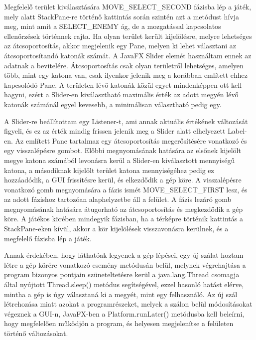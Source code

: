 Megfelelő terület kiválasztására MOVE\_SELECT\_SECOND fázisba lép a játék, mely alatt StackPane-re történő kattintás során szintén azt a metódust hívja meg, mint amit a SELECT\_ENEMY ág, de a mozgatással kapcsolatos ellenőrzések történnek rajta. Ha olyan terület került kijelölésre, melyre lehetséges az átcsoportosítás, akkor megjelenik egy Pane, melyen ki lehet választani az átcsoportosítandó katonák számát. A JavaFX Slider elemét használtam ennek az adatnak a bevitelére. Átcsoportosítás csak olyan területről lehetséges, amelyen több, mint egy katona van, csak ilyenkor jelenik meg a korábban említett ehhez kapcsolódó Pane. A területen lévő katonák közül egyet mindenképpen ott kell hagyni, ezért a Slider-en kiválasztható maximális érték az adott megyén lévő katonák számánál egyel kevesebb, a minimálisan választható pedig egy. 

A Slider-re beállítottam egy Listener-t, ami annak aktuális értékének változását figyeli, és ez az érték mindig frissen jelenik meg a Slider alatt elhelyezett Label-en. Az említett Pane tartalmaz egy átcsoportosítás megerősítésére vonatkozó és egy visszalépésre gombot. Előbbi megnyomásának hatására az elsőnek kijelölt megye katona számából levonásra kerül a Slider-en kiválasztott mennyiségű katona, a másodiknak kijelölt terület katona mennyiségéhez pedig ez hozzáadódik, a GUI frissítésre kerül, és elkezdődik a gép köre. A visszalépésre vonatkozó gomb megnyomására a fázis ismét MOVE\_SELECT\_FIRST lesz, és az adott fázishoz tartozóan alaphelyzetbe áll a felület. A fázis lezáró gomb megnyomásának hatására átugorható az átcsoportosítás és megkezdődik a gép köre. A játékos körében mindegyik fázisban, ha a térképre történik kattintás a StackPane-eken kívül, akkor a kör kijelölések visszavonásra kerülnek, és a megfelelő fázisba lép a játék. 

Annak érdekében, hogy láthatóak legyenek a gép lépései, egy új szálat hoztam létre a gép körére vonatkozó esemény metódusán belül, melynek végrehajtása a program bizonyos pontjain szüneteltetésre kerül a java.lang.Thread csomagja által nyújtott Thread.sleep() metódus segítségével, ezzel hasonló hatást elérve, mintha a gép is úgy választaná ki a megyét, mint egy felhasználó. Az új szál létrehozása miatt azokat a programrészeket, melyek a szálon belül módosításokat végeznek a GUI-n, JavaFX-ben a Platform.runLater() metódusba kell beleírni, hogy megfelelően működjön a program, és helyesen megjelenítse a felületen történő változásokat. 

